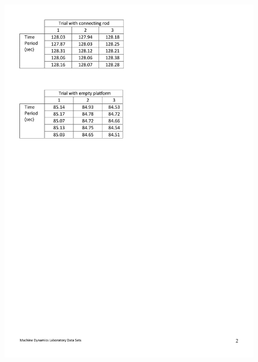 \documentclass[12pt,a4paper]{report}
\begin{document}
\begin{figure}
  \includegraphics[width=\linewidth]{dataset/mass2}
  \caption*{}
\label{}
\end{figure}
\end{document}
